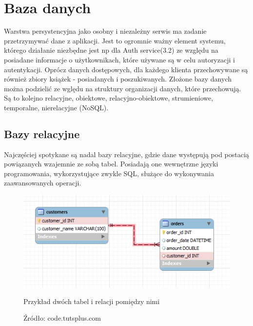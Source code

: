 \section{Baza danych}
Warstwa persystencyjna jako osobny i niezależny serwis ma zadanie przetrzymywać dane z aplikacji. Jest to ogromnie ważny element systemu, którego działanie niezbędne jest np dla Auth service(3.2) ze względu na posiadane informacje o użytkownikach, które używane są w celu autoryzacji i autentykacji.
Oprócz danych dostępowych, dla każdego klienta przechowywane są również zbiory książek - posiadanych i poszukiwanych.
Złożone bazy danych można podzielić ze wględu na struktury organizacji danych, które przechowują. Są to kolejno relacyjne, obiektowe, relacyjno-obiektowe, strumieniowe, temporalne, nierelacyjne (NoSQL).
\newpage
\subsection{Bazy relacyjne}
Najczęściej spotykane są nadal bazy relacyjne, gdzie dane występują pod postacią powiązanych wzajemnie ze sobą tabel. Posiadają one wewnętrzne języki programowania, wykorzystujące zwykle SQL, służące do wykonywania zaawansowanych operacji.
\begin{figure}[H]
	\centering
	\includegraphics[width=\linewidth]{relations.png}
	\caption{Przykład dwóch tabel i relacji pomiędzy nimi}
	\caption*{Źródło: {code.tutsplus.com}}
\end{figure}

